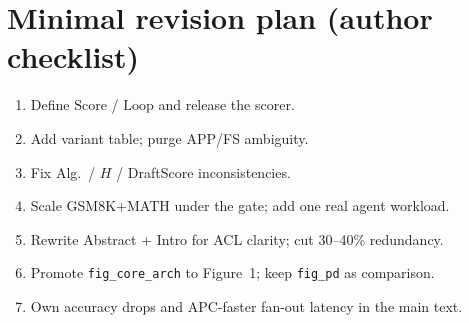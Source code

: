 \documentclass[11pt]{article}
\begin{document}
\section{Minimal revision plan (author checklist)}
\begin{enumerate}
  \item Define $\mathrm{Score}$ / $\mathrm{Loop}$ and release the scorer.
  \item Add variant table; purge APP/FS ambiguity.
  \item Fix Alg.\ / $H$ / DraftScore inconsistencies.
  \item Scale GSM8K+MATH under the gate; add one real agent workload.
  \item Rewrite Abstract + Intro for ACL clarity; cut 30--40\% redundancy.
  \item Promote \texttt{fig\_core\_arch} to Figure~1; keep \texttt{fig\_pd}
        as comparison.
  \item Own accuracy drops and APC-faster fan-out latency in the main text.
\end{enumerate}
\end{document}
